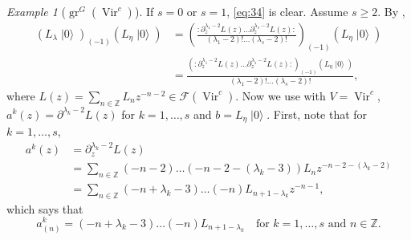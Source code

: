 \documentclass[a4paper, 12pt, reqno]{amsart}
\theoremstyle{remark}
\newtheorem{example}[theorem]{Example}
\numberwithin{equation}{subsection}
\DeclareMathOperator{\Vir}{Vir}
\DeclareMathOperator{\gr}{gr}
\DeclareMathOperator{\vac}{|0\rangle}
\begin{document}
\begin{example}[$\gr^G(\Vir^c)$]
  If $s = 0$ or $s = 1$, \eqref{eq:34} is clear.
  Assume $s \ge 2$.
  By ,
  \begin{align*}
    (L_\lambda\vac)_{(-1)}(L_{\eta}\vac) &= \left(\frac{:\partial_z^{\lambda_1 - 2}L(z)\dots\partial_z^{\lambda_s - 2}L(z):}{(\lambda_1 - 2)!\dots(\lambda_s - 2)!} \right)_{(-1)}(L_{\eta}\vac) \\
    &= \frac{(:\partial_z^{\lambda_1 - 2}L(z)\dots\partial_z^{\lambda_s - 2}L(z):)_{(-1)}(L_{\eta}\vac)}{(\lambda_1 - 2)!\dots(\lambda_s - 2)!},
  \end{align*}
  where $L(z) = \sum_{n \in \mathbb{Z}}L_nz^{-n - 2} \in \mathcal{F}(\Vir^c)$.
  Now we use  with $V = \Vir^c$, $a^k(z) = \partial^{\lambda_k - 2}L(z)$ for $k = 1, \dots, s$ and $b = L_{\eta}\vac$.
  First, note that for $k = 1, \dots, s$,
  \begin{align*}
    a^k(z) &= \partial_z^{\lambda_k - 2}L(z) \\
    &= \sum_{n \in \mathbb{Z}}(-n - 2)\dots(-n - 2 - (\lambda_k - 3))L_nz^{-n - 2 - (\lambda_k - 2)} \\
    &= \sum_{n \in \mathbb{Z}}(-n + \lambda_k - 3)\dots(-n)L_{n + 1 - \lambda_k}z^{-n - 1},
  \end{align*}
  which says that
  \begin{equation*}
    a^k_{(n)} = (-n + \lambda_k - 3)\dots(-n)L_{n + 1 - \lambda_k} \quad \text{for }k = 1, \dots, s\text{ and }n \in \mathbb{Z}.
  \end{equation*}


\end{example}
\end{document}
